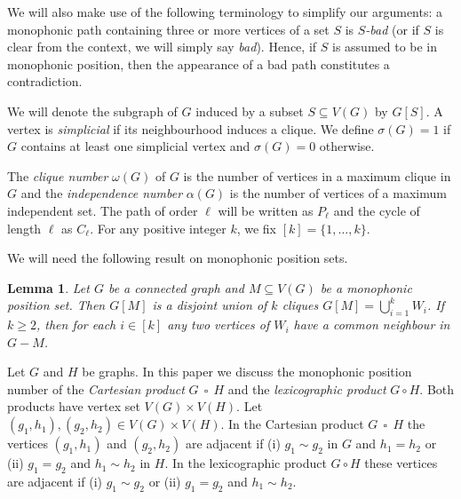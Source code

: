 \documentclass[12pt]{article}
\newtheorem{lemma}[theorem]{Lemma}
\DeclareMathOperator{\cp}{\,\square\,}
\begin{document}
We will also make use of the following terminology to simplify our arguments: a monophonic path containing three or more vertices of a set $S$ is \emph{$S$-bad} (or if $S$ is clear from the context, we will simply say \emph{bad}). Hence, if $S$ is assumed to be in monophonic position, then the appearance of a bad path constitutes a contradiction.

We will denote the subgraph of $G$ induced by a subset $S \subseteq V(G)$ by $G[S]$. A vertex is \emph{simplicial} if its neighbourhood induces a clique. We define $\sigma (G) = 1$ if $G$ contains at least one simplicial vertex and $\sigma (G) = 0$ otherwise. 

The \emph{clique number} $\omega (G)$ of $G$ is the number of vertices in a maximum clique in $G$ and the \emph{independence number} $\alpha (G)$ is the number of vertices of a maximum independent set. The path of order $\ell $ will be written as $P_{\ell}$ and the cycle of length $\ell $ as $C_{\ell }$. For any positive integer $k$, we fix $[k] = \{1,\dots,k\}$.

We will need the following result on monophonic position sets. 
\begin{lemma}
{\rm\cite[Lemma 3.1]{Thomas-2024b}}
\label{lemma:2.1}
Let $G$ be a connected graph and $M\subseteq V(G)$ be a monophonic position set. Then $G[M]$ is a disjoint union of $k$ cliques $G[M]=\bigcup_{i=1}^{k} W_{i}$. If $k\geq 2$, then for each $i\in [k]$ any two vertices of $W_i$ have a common neighbour in $G-M$.
\end{lemma}
Let $G$ and $H$ be graphs. In this paper we discuss the monophonic position number of the {\em Cartesian product} $G\cp H$ and the {\em lexicographic product} $G\circ H$. Both products have vertex set $V(G)\times V(H)$. Let $(g_1,h_1),(g_2,h_2)\in V(G)\times V(H)$. In the Cartesian product $G\cp  H$ the vertices $(g_1,h_1)$ and $(g_2,h_2)$ are adjacent if (i) $g_1 \sim g_2$ in $G$ and $h_1=h_2$ or (ii) $g_1=g_2$ and $h_1\sim h_2$ in $H$. In the lexicographic product $G\circ H$ these vertices are adjacent if (i) $g_1\sim g_2$ or (ii) $g_1=g_2$ and $h_1\sim h_2$. 
\end{document}
